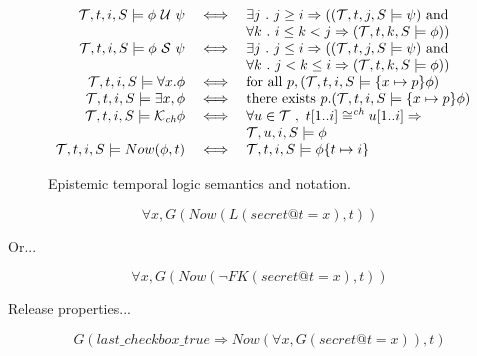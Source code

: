 \documentclass{article}
\newcommand{\aset}[1]{\{#1\}}
\newcommand{\sch}{\textit{ch}}
\newcommand{\tr}{t}
\newcommand{\tset}{\mathcal{T}}
\newcommand{\tuntil}{~\mathcal{U}~}
\newcommand{\tsince}{~\mathcal{S}~}
\newcommand{\tknows}[1]{\mathcal{K}_{#1}}
\begin{document}
\begin{figure*}[t]
\begin{displaymath}
\begin{array}{rcl}
      \tset, \tr, i , S \models \phi \tuntil \psi & \iff &
      \exists j ~.~ j \geq i \Rightarrow ((\tset, \tr, j , S \models \psi)
      \hbox{ and } \\
      & & \forall k ~.~ i \leq k < j \Rightarrow (\tset, \tr, k , S
      \models \phi)) \\

      \tset, \tr, i , S \models \phi \tsince \psi & \iff &
      \exists j ~.~ j \leq i \Rightarrow ((\tset, \tr, j , S \models \psi)
      \hbox{ and } \\
      & & \forall k ~.~ j < k \leq i \Rightarrow (\tset, \tr, k , S
      \models \phi)) \\

      \tset, \tr, i , S \models \forall x . \phi & \iff &
      \hbox{for all } p, (\tset, \tr, i , S \models \aset{x\mapsto p} \phi) \\

      \tset, \tr, i , S \models \exists x , \phi & \iff &
      \hbox{there exists } p. (\tset, \tr, i , S \models \aset{x\mapsto p} \phi) \\

      \tset, \tr, i , S \models \tknows{\sch} \phi & \iff &
      \forall u \in \tset ~,~
      \tr[1..i] \cong^{\sch} u[1..i] \Rightarrow \\ & & 
        \tset, u, i , S \models
      \phi \\

      \tset, \tr, i , S \models Now(\phi,t) & \iff &
       \tset, \tr, i , S \models \phi \aset{t\mapsto i} \\

    \end{array}
  \end{displaymath}
  \label{fig:etl}
  \caption{Epistemic temporal logic semantics and notation.}
\end{figure*}

\begin{displaymath}
  \forall x , G(Now(L(secret@t = x),t))
\end{displaymath}

Or...

\begin{displaymath}
  \forall x , G(Now(\lnot F K(secret@t = x),t))
\end{displaymath}

Release properties...

\begin{displaymath}
  G (last\_checkbox\_true \Rightarrow Now(\forall x, G(secret@t = x)),t)
\end{displaymath}
\end{document}
